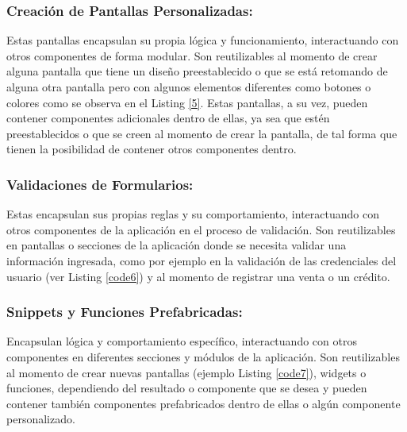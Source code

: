 \documentclass[runningheads]{llncs}
\begin{document}
            \subsubsection*{Creación de Pantallas Personalizadas:}
                Estas pantallas encapsulan su propia lógica y funcionamiento, interactuando con otros componentes de forma modular. Son reutilizables al momento de crear alguna pantalla que tiene un diseño preestablecido o que se está retomando de alguna otra pantalla pero con algunos elementos diferentes como botones o colores como se observa en el Listing \ref{5}. Estas pantallas, a su vez, pueden contener componentes adicionales dentro de ellas, ya sea que estén preestablecidos o que se creen al momento de crear la pantalla, de tal forma que tienen la posibilidad de contener otros componentes dentro.
                

            \subsubsection*{Validaciones de Formularios:}
                Estas encapsulan sus propias reglas y su comportamiento, interactuando con otros componentes de la aplicación en el proceso de validación. Son reutilizables en pantallas o secciones de la aplicación donde se necesita validar una información ingresada, como por ejemplo en la validación de las credenciales del usuario (ver Listing \ref{code6}) y al momento de registrar una venta o un crédito.
                

            \subsubsection*{Snippets y Funciones Prefabricadas:}
                Encapsulan lógica y comportamiento específico, interactuando con otros componentes en diferentes secciones y módulos de la aplicación. Son reutilizables al momento de crear nuevas pantallas (ejemplo Listing \ref{code7}), widgets o funciones, dependiendo del resultado o componente que se desea y pueden contener también componentes prefabricados dentro de ellas o algún componente personalizado.
                
\end{document}
